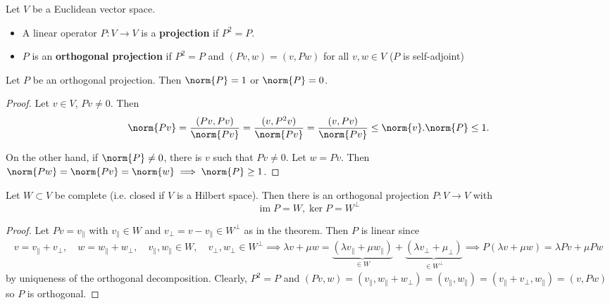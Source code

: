 \documentclass{article}
\DeclareMathOperator{\im}{im}
\begin{document}
\begin{defi}
    Let $V$ be a Euclidean vector space.
    \begin{itemize}
        \item A linear operator $P:V \to V$ is a \textbf{projection} if $P^2 = P$.
        \item $P$ is an \textbf{orthogonal projection} if $P^2 = P$ and $(Pv,w) = (v, Pw)$ for all $v, w \in V$ ($P$ is self-adjoint)
    \end{itemize}
\end{defi}

\begin{fact}
    Let $P$ be an orthogonal projection. Then $\norm{P} = 1$ or $\norm{P} = 0$.
\end{fact}

\begin{proof}
    Let $v \in V$, $Pv \neq 0$. Then
    \begin{align*}
        \norm{Pv} = \frac{(Pv, Pv)}{\norm{Pv}} = \frac{(v, P^2v)}{\norm{Pv}} = \frac{(v, Pv)}{\norm{Pv}} \leq \norm{v}.
        \norm{P} \leq 1.
    \end{align*}

    On the other hand, if $\norm{P} \neq 0$, there is $v$ such that $Pv \neq 0$. Let $w = Pv$. Then $\norm{Pw} = \norm{Pv} = \norm{w} \implies \norm{P} \geq 1$.
\end{proof}

\begin{cor}
    Let $W \subset V$ be complete (i.e. closed if $V$ is a Hilbert space).
    Then there is an orthogonal projection $P:V \to V$ with
    \begin{equation*}
        \im P = W, \ker P = W^\perp
    \end{equation*}
\end{cor}

\begin{proof}
    Let $Pv = v_\parallel$ with $v_\parallel \in W$ and $v_\perp = v - v_\parallel \in W^\perp$ as in the theorem.
    Then $P$ is linear since
    \begin{gather*}
        v = v_\parallel + v_\perp, \quad w = w_\parallel + w_\perp, \quad v_\parallel, w_\parallel \in W, \quad v_\perp, w_\perp \in W^\perp
        \implies \lambda v + \mu w = \underbrace{(\lambda v_\parallel + \mu w_\parallel)}_{\in W} + \underbrace{(\lambda v_\perp + \mu_\perp)}_{\in W^\perp}
        \implies P(\lambda v + \mu w) = \lambda P v + \mu P w
    \end{gather*}
    by uniqueness of the orthogonal decomposition.
    Clearly, $P^2 = P$ and $(Pv, w) = (v_\parallel, w_\parallel + w_\perp) = (v_\parallel, w_\parallel) = (v_\parallel + v_\perp, w_\parallel) = (v, Pw)$ so $P$ is orthogonal.
\end{proof}
\end{document}
